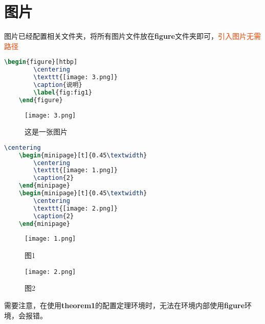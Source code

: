 \documentclass[12pt, a4paper, oneside, UTF8]{ctexbook}
\begin{document}
\fi

\chapter{图片}

图片已经配置相关文件夹，将所有图片文件放在\textbf{figure}文件夹即可，\textcolor{OrangeRed}{引入图片无需路径}

\begin{lstlisting}[language=TeX]
    \begin{figure}[htbp]
        \centering
        \texttt{[image: 3.png]}
        \caption{说明}
        \label{fig:fig1}
    \end{figure}
\end{lstlisting}

\begin{figure}[htbp]
    \centering
    \texttt{[image: 3.png]}
    \caption{这是一张图片}
    \label{fig:fig1}
\end{figure}


\begin{lstlisting}[language=TeX]
    \centering
    \begin{minipage}[t]{0.45\textwidth}
        \centering
        \texttt{[image: 1.png]}
        \caption{2}
    \end{minipage}
    \begin{minipage}[t]{0.45\textwidth}
        \centering
        \texttt{[image: 2.png]}
        \caption{2}
    \end{minipage}
\end{lstlisting}

\begin{figure}[htbp]
    \centering
    \begin{minipage}[t]{0.48\textwidth}
        \centering
        \texttt{[image: 1.png]}
        \caption{图1}
    \end{minipage}
    \begin{minipage}[t]{0.48\textwidth}
        \centering
        \texttt{[image: 2.png]}
        \caption{图2}
    \end{minipage}
\end{figure}

\begin{remark}
    需要注意，在使用\textbf{theorem1}的配置定理环境时，无法在环境内部使用\textbf{figure}环境，会报错。
\end{remark}

\ifx\allfiles\undefined
\end{document}
